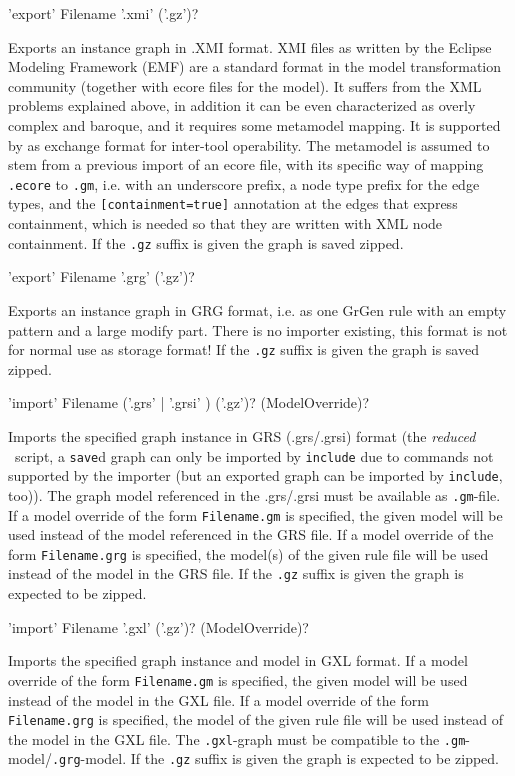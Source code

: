 \begin{rail}
  'export' Filename '.xmi' ('.gz')?
\end{rail}
Exports an instance graph in .XMI format.
XMI files as written by the Eclipse Modeling Framework (EMF) are a standard format in the model transformation community (together with ecore files for the model).
It suffers from the XML problems explained above, in addition it can be even characterized as overly complex and baroque, and it requires some metamodel mapping.
It is supported by \GrG{} as exchange format for inter-tool operability.
The metamodel is assumed to stem from a previous import of an ecore file, with its specific way of mapping \texttt{.ecore} to \texttt{.gm}, i.e. with an underscore prefix, a node type prefix for the edge types, and the \verb#[containment=true]# annotation at the edges that express containment, which is needed so that they are written with XML node containment.
If the \texttt{.gz} suffix is given the graph is saved zipped.


\begin{rail}
  'export' Filename '.grg' ('.gz')?
\end{rail}
Exports an instance graph in GRG format, i.e. as one GrGen rule with an empty pattern and a large modify part.
There is no importer existing, this format is not for normal use as storage format!
If the \texttt{.gz} suffix is given the graph is saved zipped.

\begin{rail}
  'import' Filename ('.grs' | '.grsi' ) ('.gz')? (ModelOverride)?
\end{rail}
Imports the specified graph instance in GRS (.grs/.grsi) format (the \emph{reduced} \GrShell\ script,
a \texttt{save}d graph can only be imported by \texttt{include} due to commands not supported by the importer (but an exported graph can be imported by \texttt{include}, too)).
The graph model referenced in the .grs/.grsi must be available as \texttt{.gm}-file.
If a model override of the form \texttt{Filename.gm} is specified, the given model will be used instead of the model referenced in the GRS file.
If a model override of the form \texttt{Filename.grg} is specified, the model(s) of the given rule file will be used instead of the model in the GRS file.
If the \texttt{.gz} suffix is given the graph is expected to be zipped.

\begin{rail}
  'import' Filename '.gxl' ('.gz')? (ModelOverride)?
\end{rail}
Imports the specified graph instance and model in GXL format.
If a model override of the form \texttt{Filename.gm} is specified, the given model will be used instead of the model in the GXL file.
If a model override of the form \texttt{Filename.grg} is specified, the model of the given rule file will be used instead of the model in the GXL file.
The \texttt{.gxl}-graph must be compatible to the \texttt{.gm}-model/\texttt{.grg}-model.
If the \texttt{.gz} suffix is given the graph is expected to be zipped.


